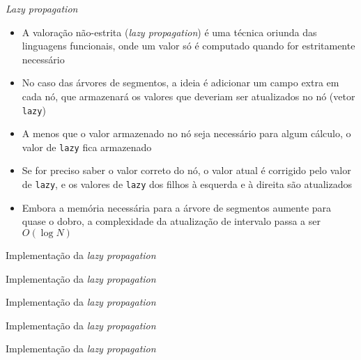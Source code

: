 \begin{frame}[fragile]{\it Lazy propagation}

    \begin{itemize}
        \item A valoração não-estrita (\textit{lazy propagation}) é uma técnica oriunda das
            linguagens funcionais, onde um valor só é computado quando for estritamente
            necessário

        \item No caso das árvores de segmentos, a ideia é adicionar um campo extra em cada
            nó, que armazenará os valores que deveriam ser atualizados no nó (vetor \texttt{lazy})

        \item A menos que o valor armazenado no nó seja necessário para algum cálculo, o
            valor de \texttt{lazy} fica armazenado 

        \item Se for preciso saber o valor correto do nó, o valor atual é corrigido pelo valor de
            \texttt{lazy}, e os valores de \texttt{lazy} dos filhos à esquerda e à direita
            são atualizados

        \item Embora a memória necessária para a árvore de segmentos aumente para quase o dobro,
            a complexidade da atualização de intervalo passa a ser $O(\log N)$
    \end{itemize}

\end{frame}



\begin{frame}[fragile]{Implementação da {\it lazy propagation}}
\end{frame}

\begin{frame}[fragile]{Implementação da {\it lazy propagation}}
\end{frame}

\begin{frame}[fragile]{Implementação da {\it lazy propagation}}
\end{frame}

\begin{frame}[fragile]{Implementação da {\it lazy propagation}}
\end{frame}

\begin{frame}[fragile]{Implementação da {\it lazy propagation}}
\end{frame}
